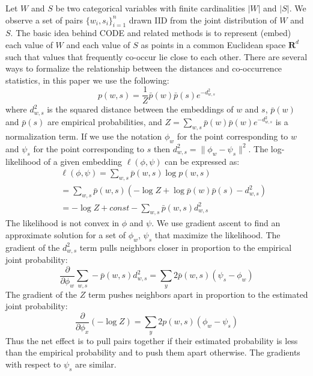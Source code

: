 Let $W$ and $S$ be two categorical variables with finite cardinalities
$|W|$ and $|S|$.  We observe a set of pairs $\{w_i, s_i\}_{i=1}^n$
drawn IID from the joint distribution of $W$ and $S$.  The basic idea
behind CODE and related methods is to represent (embed) each value of
$W$ and each value of $S$ as points in a common Euclidean space
$\mathbf{R}^d$ such that values that frequently co-occur lie close to
each other.  There are several ways to formalize the relationship
between the distances and co-occurrence statistics, in this paper we
use the following:
\begin{equation} \label{eq:probability}
p(w,s) = \frac{1}{Z} \bar{p}(w) \bar{p}(s) e^{-d^2_{w,s}}
\end{equation}
\noindent where $d^2_{w,s}$ is the squared distance between the
embeddings of $w$ and $s$, $\bar{p}(w)$ and $\bar{p}(s)$ are empirical
probabilities, and $Z=\sum_{w,s} \bar{p}(w) \bar{p}(w) e^{-d^2_{w,s}}$
is a normalization term.  If we use the notation $\phi_w$ for the
point corresponding to $w$ and $\psi_s$ for the point corresponding to
$s$ then $d^2_{w,s} = \|\phi_w-\psi_s\|^2$.  The log-likelihood of a
given embedding $\ell(\phi, \psi)$ can be expressed as:
\begin{eqnarray}
&&\ell(\phi, \psi) = \sum_{w,s} \bar{p}(w,s) \log p(w,s) \label{eq:likelihood} \\
&&= \sum_{w,s} \bar{p}(w,s) (-\log Z + \log \bar{p}(w)\bar{p}(s) - d^2_{w,s}) \nonumber \\
&&= -\log Z + \mathit{const} - \sum_{w,s} \bar{p}(w,s) d^2_{w,s} \nonumber
\end{eqnarray}
The likelihood is not convex in $\phi$ and $\psi$.  We use gradient
ascent to find an approximate solution for a set of $\phi_w$, $\psi_s$
that maximize the likelihood.  The gradient of the $d^2_{w,s}$ term
pulls neighbors closer in proportion to the empirical joint
probability:
\begin{equation}
\frac{\partial}{\partial\phi_w} \sum_{w,s} -\bar{p}(w,s) d^2_{w,s} =
\sum_y 2 \bar{p}(w,s) (\psi_s - \phi_w) \label{eq:attract}
\end{equation}
The gradient of the $Z$ term pushes neighbors apart in proportion to the
estimated joint probability:
\begin{equation}
\frac{\partial}{\partial\phi_x} (-\log Z) = \sum_y 2 p(w,s) (\phi_w -
\psi_s) \label{eq:repulse}
\end{equation}
Thus the net effect is to pull pairs together if their estimated
probability is less than the empirical probability and to push them
apart otherwise.  The gradients with respect to $\psi_s$ are similar.

